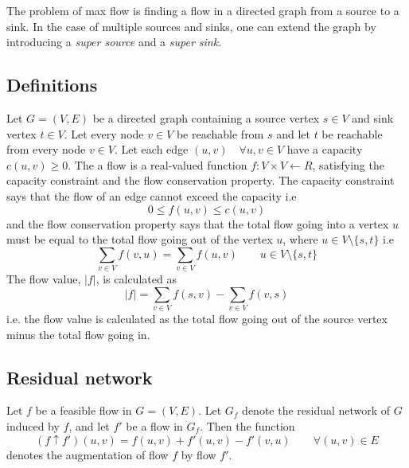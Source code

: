 \documentclass[10pt]{article}
\begin{document}
\newpage

The problem of max flow is finding a flow in a directed graph from a source to a sink. In the case of multiple sources and sinks, one can extend the graph by introducing a \emph{super source} and a \emph{super sink}.

\subsection{Definitions} %
\label{sub:definitions}
Let $G = (V,E)$ be a directed graph containing a source vertex $s \in V$ and sink vertex $t \in V$. Let every node $v \in V$ be reachable from $s$ and let $t$ be reachable from every node $v \in V$. Let each edge $(u,v) \quad \forall u,v \in V$ have a capacity $c(u,v) \geq 0$. The a flow is a real-valued function $f: V \times V \leftarrow R$, satisfying the capacity constraint and the flow conservation property. The capacity constraint says that the flow of an edge cannot exceed the capacity i.e
\begin{equation}
  0 \leq f(u,v) \leq c(u,v)
\end{equation} 
and the flow conservation property says that the total flow going into a vertex $u$ must be equal to the total flow going out of the vertex $u$, where $u \in V \setminus \{s,t\}$ i.e
\begin{equation}
  \sum_{v \in V} f(v,u) = \sum_{v \in V} f(u,v) \qquad u \in V \setminus \{s,t\}
\end{equation} 
The flow value, $|f|$, is calculated as
\begin{equation}
  |f| = \sum_{v \in V} f(s,v) - \sum_{v \in V} f(v,s)
\end{equation}
i.e. the flow value is calculated as the total flow going out of the source vertex minus the total flow going in.

\subsection{Residual network} %
\label{sub:residual_network}
Let $f$ be a feasible flow in $G = (V,E)$. Let $G_f$ denote the residual network of $G$ induced by $f$, and let $f'$ be a flow in $G_f$. Then the function 
\begin{equation}
  (f \uparrow f')(u,v) = f(u,v)+f'(u,v)-f'(v,u) \qquad \forall (u,v) \in E
\end{equation}
denotes the augmentation of flow $f$ by flow $f'$.
\end{document}
